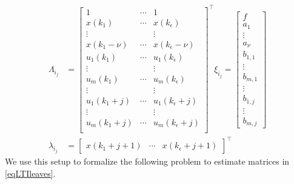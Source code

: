 \documentclass[]{ifacconf}  %
\begin{document}
\begin{align}
\Lambda_{i_j} &= \left[\begin{array}{ccc}
						1               & \cdots & 1                    \\ 
						x(k_1)         & \cdots & x(k_\epsilon)       \\  
						\vdots          &        &     \vdots           \\
						x(k_1 - \nu)   & \cdots & x(k_\epsilon - \nu) \\
						u_1(k_1)        & \cdots & u_1(k_\epsilon)      \\
						\vdots          &        & \vdots               \\
						u_m(k_1)        & \cdots & u_m(k_\epsilon)      \\ 
						\vdots          &        & \vdots               \\ 
						u_1(k_1 + j)    & \cdots & u_1(k_\epsilon + j)  \\
						\vdots          &        & \vdots               \\
						u_m(k_1  +j)    & \cdots & u_m(k_\epsilon + j)  \\   
				 \end{array}\right]^\top
\xi_{i_j}      = \left[\begin{array}{c}
				 		f \\ a_1 \\ \vdots \\ a_\nu \\ b_{1,1} \\ \vdots  \\ b_{m,1} \\ \vdots \\ b_{1,j} \\ \vdots \\ b_{m,j}
				 \end{array}\right]\\
\lambda_{i_j} &= \left[\begin{array}{ccc}
						x(k_1 + j + 1) & \cdots & x(k_\epsilon + j + 1)
				 \end{array}\right]^\top
\end{align}
\normalsize
We use this setup to formalize the following problem to estimate matrices in \eqref{eqLTIleaves}.
\end{document}
